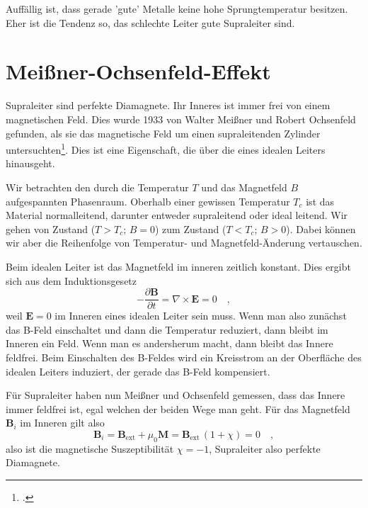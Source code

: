 Auffällig ist, dass gerade 'gute' Metalle keine hohe Sprungtemperatur besitzen. Eher ist die Tendenz so, das schlechte Leiter gute Supraleiter sind.




\section*{Meißner-Ochsenfeld-Effekt}

Supraleiter sind perfekte Diamagnete. Ihr Inneres ist immer frei von einem magnetischen Feld. Dies wurde 1933 von Walter Meißner und Robert Ochsenfeld gefunden, als sie das magnetische Feld um einen supraleitenden Zylinder untersuchten\footcite{Meissner1933}. Dies ist eine Eigenschaft, die über die eines idealen Leiters hinausgeht. 


Wir betrachten den durch die Temperatur $T$ und das Magnetfeld $B$ aufgespannten Phasenraum. Oberhalb einer gewissen Temperatur $T_c$ ist das Material normalleitend, darunter entweder supraleitend oder ideal leitend. Wir gehen von Zustand  ($T > T_c$; $B=0$) zum Zustand ($T < T_c$; $B > 0$). Dabei können wir aber die Reihenfolge von Temperatur- und Magnetfeld-Änderung vertauschen.

Beim idealen Leiter ist das Magnetfeld im inneren zeitlich konstant. Dies ergibt sich aus dem Induktionsgesetz
\begin{equation}
    - \frac{\partial \bm{B}}{\partial t} = \nabla \times \bm{E} = 0 \quad ,
\end{equation}
weil $ \bm{E} = 0$ im Inneren eines idealen Leiter sein muss. Wenn man also zunächst das B-Feld einschaltet und dann die Temperatur reduziert, dann bleibt im Inneren ein Feld. Wenn man es andersherum macht, dann bleibt das Innere feldfrei. Beim Einschalten des B-Feldes wird ein Kreisstrom an der Oberfläche des idealen Leiters induziert, der gerade das B-Feld kompensiert.

Für Supraleiter haben nun Meißner und Ochsenfeld gemessen, dass das Innere immer feldfrei ist, egal welchen der beiden Wege man geht. Für das Magnetfeld $\bm{B}_i$ im Inneren gilt also
\begin{equation}
    \bm{B}_i = \bm{B}_\text{ext} +  \mu_0 \bm{M} =\bm{B}_\text{ext}  \, (1 + \chi)  = 0 \quad ,
\end{equation}
also ist die magnetische Suszeptibilität $\chi = -1$, Supraleiter also perfekte Diamagnete.

